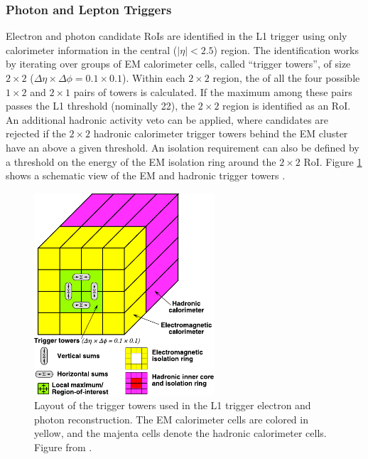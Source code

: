 \subsubsection{Photon and Lepton Triggers}

Electron and photon candidate RoIs are identified in the L1 trigger using only calorimeter information in the central ($|\eta|<2.5$) region. The identification works by iterating over groups of EM calorimeter cells, called ``trigger towers'', of size $2\times2$ ($\Delta\eta\times\Delta\phi = 0.1\times0.1$). Within each $2\times2$ region, the \et of all the four possible $1\times2$ and $2\times1$ pairs of towers is calculated. If the maximum \et among these pairs passes the L1 \et threshold (nominally 22\GeV), the $2\times2$ region is identified as an RoI. An additional hadronic activity veto can be applied, where candidates are rejected if the $2\times2$ hadronic calorimeter trigger towers behind the EM cluster have an \et above a given threshold. An isolation requirement can also be defined by a threshold on the energy of the EM isolation ring around the $2\times2$ RoI. Figure \ref{fig:triggertower} shows a schematic view of the EM and hadronic trigger towers \cite{Atlas:trigegamma,Atlas:trig2015}.
\begin{figure}[t]
   \centering
   \includegraphics[width=0.6\textwidth]{plots/atlas/triggertower.pdf} 
   \caption{Layout of the trigger towers used in the L1 trigger electron and photon reconstruction. The EM calorimeter cells are colored in yellow, and the majenta cells denote the hadronic calorimeter cells. Figure from \cite{Atlas:trig2015}.\label{fig:triggertower}}
\end{figure}


